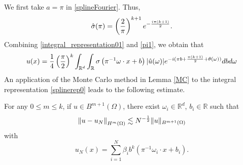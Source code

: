 We first take $a=\pi$ in \eqref{splineFourier}. Thus,
\begin{equation}
  \label{pi1}
\hat\sigma(\pi)=
\left({2\over \pi}\right)^{k+1}e^{-{i\pi (k+1)\over 2}}.
\end{equation}
Combining \eqref{integral_representation01} and \eqref{pi1}, we obtain
that
\begin{equation}
  \label{splinerep0}
u(x) = 
\frac{1}{4}\left({\pi\over 2}\right)^{k}\int_{\mathbb{R}^d}\int_\mathbb{R}
\sigma\left(\pi^{-1}\omega\cdot x+b\right)|\hat{u}(\omega)|e^{-i(\pi b + {\pi (k+1)\over 2}+\theta(\omega))}dbd\omega
\end{equation}
An application of the Monte Carlo method in Lemma \ref{MC} to the integral representation \eqref{splinerep0} leads to the following estimate.
\begin{theorem}\label{splinestratify}
For any $0\le m\le k$, if $u\in {B}^{m+1}(\Omega)$, there exist $\omega_i\in \mathbb{R}^d$, $b_i\in \mathbb{R}$ such that
\begin{equation}
\left \|u - u_{N}\right\|_{H^{m}(\Omega)}\lesssim  N^{-{1\over 2}} \|u\|_{{B}^{m+1}(\Omega)}
\end{equation}
with
\begin{equation}
u_{N}(x)=\sum_{i=1}^{N} \beta_i b^k\left(\pi^{-1} \omega_i\cdot x+b_i\right).
\end{equation} 
\end{theorem}

